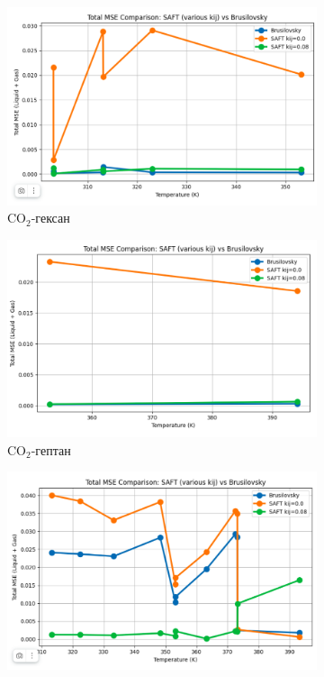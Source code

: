 \documentclass[a4paper,12pt]{article}
\begin{document}
\begin{itemize}
\begin{itemize}
\begin{figure}[ht]
    \begin{subfigure}{0.30\textwidth}
        \centering
        \includegraphics[width=\textwidth]{images/mole_hexane.png}
        \caption{$\mathrm{CO}_2$-гексан}
        \label{fig:rmse_hexane}
    \end{subfigure}
    \hfill
    \begin{subfigure}{0.30\textwidth}
        \centering
        \includegraphics[width=\textwidth]{images/mole_heptane.png}
        \caption{$\mathrm{CO}_2$-гептан}
        \label{fig:rmse_heptane}
    \end{subfigure}
    \hfill
    \begin{subfigure}{0.30\textwidth}
        \centering
        \includegraphics[width=\textwidth]{images/mole_octane.png}

\end{subfigure}
\end{figure}
\end{itemize}
\end{itemize}
\end{document}
